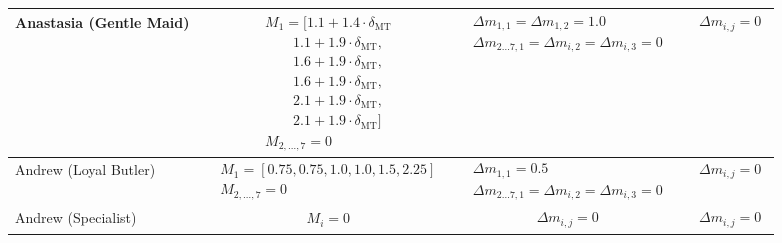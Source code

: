 \documentclass[twocolumn,10pt]{article}
\begin{document}
\begin{landscape}
\begin{longtable}{lccc}
Anastasia (Gentle Maid) &
$\begin{aligned}
& M_1 = [1.1 + 1.4 \cdot \delta_\text{MT}\\
& \qquad 1.1 + 1.9 \cdot \delta_\text{MT},\\
& \qquad 1.6 + 1.9 \cdot \delta_\text{MT},\\
& \qquad 1.6 + 1.9 \cdot \delta_\text{MT},\\
& \qquad 2.1 + 1.9 \cdot \delta_\text{MT},\\
& \qquad 2.1 + 1.9 \cdot \delta_\text{MT}] \\
& M_{2,\dots,7} = 0
\end{aligned}$ &
$\begin{aligned}
& \Delta m_{1,1} = \Delta m_{1,2} = 1.0 \\
& \Delta m_{2\dots7, 1} = \Delta m_{i,2} = \Delta m_{i,3}= 0
\end{aligned}$ &
$\begin{aligned}
& \Delta m_{i,j} = 0
\end{aligned}$ \\
\midrule

Andrew (Loyal Butler) &
$\begin{aligned}
& M_1 = [0.75, 0.75, 1.0, 1.0, 1.5, 2.25] \\
& M_{2,\dots,7} = 0
\end{aligned}$ &
$\begin{aligned}
& \Delta m_{1,1} = 0.5 \\
& \Delta m_{2\dots7, 1} = \Delta m_{i,2} = \Delta m_{i,3} = 0
\end{aligned}$ &
$\begin{aligned}
& \Delta m_{i,j} = 0
\end{aligned}$ \\
\midrule

Andrew (Specialist) &
$\begin{aligned}
& M_{i} = 0
\end{aligned}$ &
$\begin{aligned}
& \Delta m_{i, j} = 0
\end{aligned}$ &
$\begin{aligned}
& \Delta m_{i,j} = 0
\end{aligned}$ \\
\midrule


\end{longtable}
\end{landscape}
\end{document}
